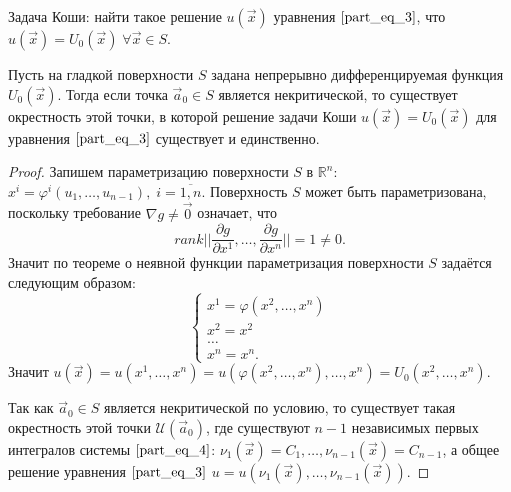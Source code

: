 Задача Коши: найти такое решение $u \left( \vec{x} \right)$ уравнения $\eqref{part_eq_3}$, что $u \left( \vec{x} \right) = U_0 \left( \vec{x} \right) \; \forall \vec{x} \in S$.

\begin{theorem}
    Пусть на гладкой поверхности $S$ задана непрерывно дифференцируемая функция $U_0 \left( \vec{x} \right)$. Тогда если точка $\vec{a}_0 \in S$ является некритической, то существует окрестность этой точки, в которой решение задачи Коши $u \left( \vec{x} \right) = U_0 \left( \vec{x} \right)$ для уравнения $\eqref{part_eq_3}$ существует и единственно.
\end{theorem}
\begin{proof}
    Запишем параметризацию поверхности $S$ в $\mathbb{R}^n$: $x^i = \varphi^i \left( u_1, \dots, u_{n - 1} \right), \; i = \overline{1, n}$. Поверхность $S$ может быть параметризована, поскольку требование $\nabla g \neq \vec{0}$ означает, что 
    \begin{equation*}
        rank \bigg| \bigg| \frac{\partial g}{\partial x^{1}}, \dots, \frac{\partial g}{\partial x^{n}} \bigg| \bigg| = 1 \neq 0.
    \end{equation*}
    Значит по теореме о неявной функции параметризация поверхности $S$ задаётся следующим образом:
    \begin{equation*}
        \begin{cases}
            x^1 = \varphi \left( x^2, \dots, x^n \right) \\
            x^2 = x^2                                    \\
            \dots                                        \\
            x^n = x^n.
        \end{cases}
    \end{equation*}
    Значит $u \left( \vec{x} \right) = u \left( x^1, \dots, x^n \right) = u \left( \varphi \left( x^2, \dots, x^n \right), \dots, x^n \right) = U_0 \left( x^2, \dots, x^n \right)$.
    
    Так как $\vec{a}_0 \in S$ является некритической по условию, то существует такая окрестность этой точки $\mathcal{U}  \left( \vec{a}_0 \right)$, где существуют $n - 1$ независимых первых интегралов системы $\eqref{part_eq_4}$: $\nu_1 \left( \vec{x} \right) = C_1, \dots, \nu_{n - 1} \left( \vec{x} \right) = C_{n - 1}$, а общее решение уравнения $\eqref{part_eq_3}$ $u = u \left( \nu_1 \left( \vec{x} \right), \dots, \nu_{n - 1} \left( \vec{x} \right) \right)$. 


\end{proof}
